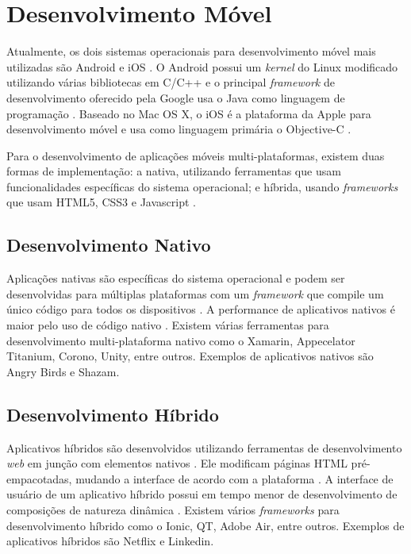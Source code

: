 \section{Desenvolvimento Móvel}

Atualmente, os dois sistemas operacionais para desenvolvimento móvel mais utilizadas são Android e iOS \cite{gartner-top-os}. O Android possui um \textit{kernel} do Linux modificado utilizando várias bibliotecas em C/C++ \cite{mobile-dev} e o principal \textit{framework} de desenvolvimento oferecido pela Google usa o Java como linguagem de programação \cite{android}. Baseado no Mac OS X, o iOS é a plataforma da Apple para desenvolvimento móvel e usa como linguagem primária o Objective-C \cite{mobile-dev}. 

Para o desenvolvimento de aplicações móveis multi-plataformas, existem duas formas de implementação: a nativa, utilizando ferramentas que usam funcionalidades específicas do sistema operacional; e híbrida, usando \textit{frameworks} que usam HTML5, CSS3 e Javascript \cite{mobile-dev-2}.

\subsection{Desenvolvimento Nativo}

Aplicações nativas são específicas do sistema operacional e podem ser desenvolvidas para múltiplas plataformas com um \textit{framework} que compile um único código para todos os dispositivos \cite{hybrid-1}. A performance de aplicativos nativos é maior pelo uso de código nativo \cite{hybrid-2}. Existem várias ferramentas para desenvolvimento multi-plataforma nativo como o Xamarin, Appecelator Titanium, Corono, Unity, entre outros. Exemplos de aplicativos nativos são Angry Birds e Shazam.

\subsection{Desenvolvimento Híbrido}

Aplicativos híbridos são desenvolvidos utilizando ferramentas de desenvolvimento \textit{web} em junção com elementos nativos \cite{hybrid-1}. Ele modificam páginas HTML pré-empacotadas, mudando a interface de acordo com a plataforma \cite{hybrid-2}. A interface de usuário de um aplicativo híbrido possui em tempo menor de desenvolvimento de composições de natureza dinâmica \cite{mobile-dev-2}. Existem vários \textit{frameworks} para desenvolvimento híbrido como o Ionic, QT, Adobe Air, entre outros. Exemplos de aplicativos híbridos são Netflix e Linkedin.
